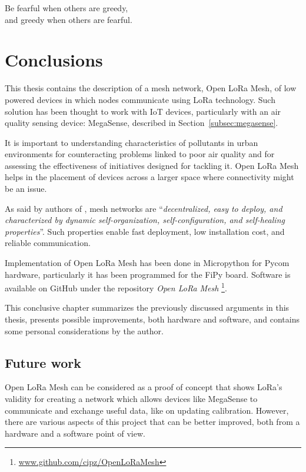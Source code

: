 
\begin{savequote}[70mm]
	Be fearful when others are greedy,\\
	and greedy when others are fearful.
\end{savequote}

\chapter{Conclusions}\label{chapter:conclusions}

	This thesis contains the description of a mesh network, Open LoRa Mesh, of low powered devices in which nodes communicate using LoRa technology.
	Such solution has been thought to work with IoT devices, particularly with an air quality sensing device: MegaSense, described in Section~\ref{subsec:megasense}.
	
	It is important to understanding characteristics of pollutants in urban environments for counteracting problems linked to poor air quality and for assessing the effectiveness of initiatives designed for tackling it.
	Open LoRa Mesh helps in the placement of devices across a larger space where connectivity might be an issue.
	
	As said by authors of \cite{Sampaio-2015}, mesh networks are ``\textit{decentralized, easy to deploy, and characterized by dynamic self-organization, self-configuration, and self-healing properties}''.
	Such properties enable fast deployment, low installation cost, and reliable communication.
		
	Implementation of Open LoRa Mesh has been done in Micropython for Pycom hardware, particularly it has been programmed for the FiPy board.
	Software is available on GitHub under the repository \textit{Open LoRa Mesh} \footnote{ \url{www.github.com/cipz/OpenLoRaMesh}}.
	
	This conclusive chapter summarizes the previously discussed arguments in this thesis, presents possible improvements, both hardware and software, and contains some personal considerations by the author.

	\section{Future work}
		
		Open LoRa Mesh can be considered as a proof of concept that shows LoRa's validity for creating a network which allows devices like MegaSense to communicate and exchange useful data, like on updating calibration.
		However, there are various aspects of this project that can be better improved, both from a hardware and a software point of view.
	
